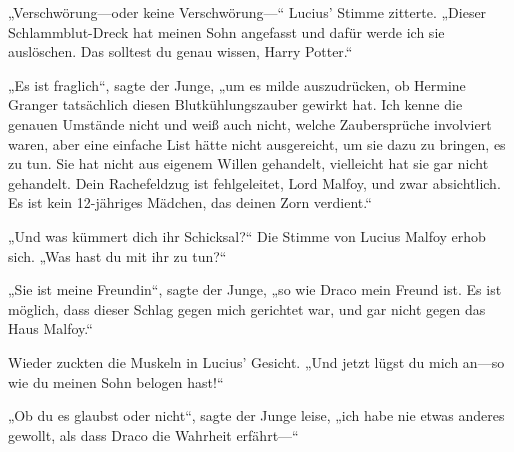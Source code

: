 „Verschwörung—oder keine Verschwörung—“ Lucius’ Stimme zitterte. „Dieser Schlammblut-Dreck hat meinen Sohn angefasst und dafür werde ich sie auslöschen. Das solltest du genau wissen, Harry Potter.“

„Es ist fraglich“, sagte der Junge, „um es milde auszudrücken, ob Hermine Granger tatsächlich diesen Blutkühlungszauber gewirkt hat. Ich kenne die genauen Umstände nicht und weiß auch nicht, welche Zaubersprüche involviert waren, aber eine einfache List hätte nicht ausgereicht, um sie dazu zu bringen, es zu tun. Sie hat nicht aus eigenem Willen gehandelt, vielleicht hat sie gar nicht gehandelt. Dein Rachefeldzug ist fehlgeleitet, Lord Malfoy, und zwar absichtlich. Es ist kein 12-jähriges Mädchen, das deinen Zorn verdient.“

„Und was kümmert dich ihr Schicksal?“ Die Stimme von Lucius Malfoy erhob sich. „Was hast du mit ihr zu tun?“

„Sie ist meine Freundin“, sagte der Junge, „so wie Draco mein Freund ist. Es ist möglich, dass dieser Schlag gegen mich gerichtet war, und gar nicht gegen das Haus Malfoy.“

Wieder zuckten die Muskeln in Lucius’ Gesicht.
„Und jetzt lügst du mich an—so wie du meinen Sohn belogen hast!“

„Ob du es glaubst oder nicht“, sagte der Junge leise, „ich habe nie etwas anderes gewollt, als dass Draco die Wahrheit erfährt—“

